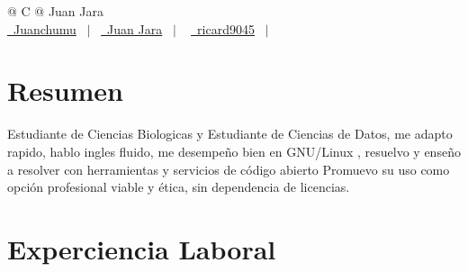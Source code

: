 \documentclass[a4paper,12pt]{article}
\makeatletter
\newenvironment{jobshort}[2]
    {
    \begin{tabularx}{\linewidth}{@{}l X r@{}}
    \textbf{#1} & \hfill &  #2 \\[3.75pt]
    \end{tabularx}
    }
    {
    }
\makeatother
\begin{document}
\pagestyle{empty} 



\begin{tabularx}{\linewidth}{@{} C @{}}
\Huge{Juan Jara} \\[7.5pt]
\href{https://github.com/Juanchumu}{\raisebox{-0.05\height}\faGithub\ Juanchumu} \ $|$ \ 
\href{https://linkedin.com/in/th3ju4nc3r}{\raisebox{-0.05\height}\faLinkedin\ Juan Jara} \ $|$ \ 
\href{mailto:ricard9045@gmail.com}{\raisebox{-0.05\height}\faEnvelope \ ricard9045} \ $|$ \ 
\end{tabularx}


\section{Resumen}
Estudiante de Ciencias Biologicas y Estudiante de Ciencias de Datos, me adapto rapido, hablo ingles fluido, me desempeño bien en GNU/Linux \faLinux, resuelvo y enseño a resolver
con herramientas y servicios de código abierto
Promuevo su uso como opción profesional viable y ética, sin dependencia de licencias.

\section{Experciencia Laboral}

\end{document}

